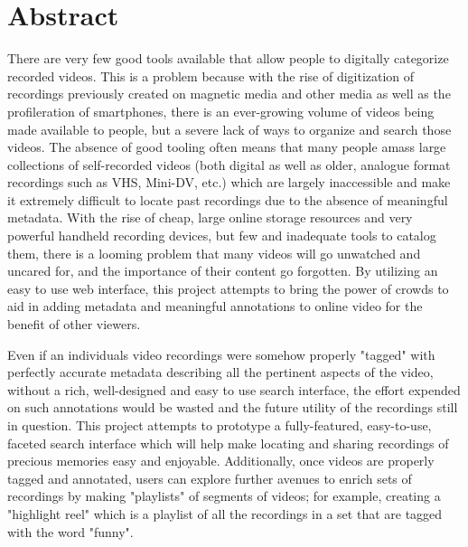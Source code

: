 %
\chapter*{Abstract}
\label{sec:abstract}
\vspace*{-10mm}






There are very few good tools available that allow people to digitally categorize recorded videos.  This is a problem because with the rise of digitization of recordings previously created on magnetic media and other media as well as the profileration of smartphones, there is an ever-growing volume of videos being made available to people, but a severe lack of ways to organize and search those videos.  The absence of good tooling often means that many people amass large collections of self-recorded videos (both digital as well as older, analogue format recordings such as VHS, Mini-DV, etc.) which are largely inaccessible and make it extremely difficult to locate past recordings due to the absence of meaningful metadata.  With the rise of cheap, large online storage resources and very powerful handheld recording devices, but few and inadequate tools to catalog them, there is a looming problem that many videos will go unwatched and uncared for, and the importance of their content go forgotten. By utilizing an easy to use web interface, this project attempts to bring the power of crowds to aid in adding metadata and meaningful annotations to online video for the benefit of other viewers. 


Even if an individuals video recordings were somehow properly "tagged" with perfectly accurate metadata describing all the pertinent aspects of the video, without a rich, well-designed and easy to use search interface, the effort expended on such annotations would be wasted and the future utility of the recordings still in question.  This project attempts to prototype a fully-featured, easy-to-use, faceted search interface which will help make locating and sharing recordings of precious memories easy and enjoyable.  Additionally, once videos are properly tagged and annotated, users can explore further avenues to enrich sets of recordings by making "playlists" of segments of videos; for example, creating a "highlight reel" which is a playlist of all the recordings in a set that are tagged with the word "funny".

